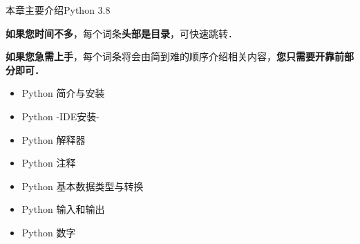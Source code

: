 
\begin{issues}
\issueTODO
\end{issues}

本章主要介绍Python 3.8

\textbf{如果您时间不多}，每个词条\textbf{头部是目录}，可快速跳转．

\textbf{如果您急需上手}，每个词条将会由简到难的顺序介绍相关内容，\textbf{您只需要开靠前部分即可．}

\begin{itemize}
\item Python 简介与安装
\item Python -IDE安装-
\item Python 解释器
\item Python 注释
\item Python 基本数据类型与转换
\item Python 输入和输出
\item Python 数字
\end{itemize}
